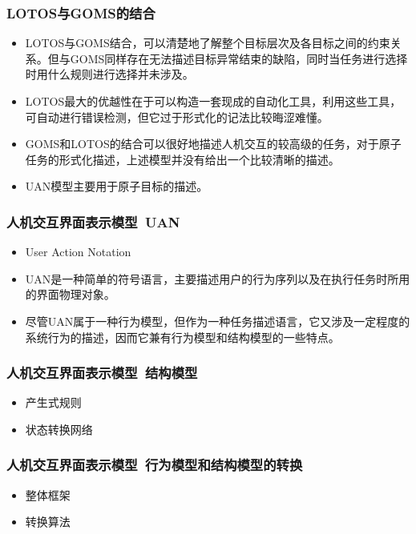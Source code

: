 \documentclass{beamer}
\begin{document}
\begin{frame}
	\frametitle{LOTOS与GOMS的结合}
	\beamertemplatetransparentcovereddynamicmedium
	\begin{itemize}[<+->]
		\item LOTOS与GOMS结合，可以清楚地了解整个目标层次及各目标之间的约束关系。但与GOMS同样存在无法描述目标异常结束的缺陷，同时当任务进行选择时用什么规则进行选择并未涉及。
		\item LOTOS最大的优越性在于可以构造一套现成的自动化工具，利用这些工具，可自动进行错误检测，但它过于形式化的记法比较晦涩难懂。
		\item GOMS和LOTOS的结合可以很好地描述人机交互的较高级的任务，对于原子任务的形式化描述，上述模型并没有给出一个比较清晰的描述。
		\item UAN模型主要用于原子目标的描述。
	\end{itemize}
\end{frame}

\begin{frame}
	\frametitle{人机交互界面表示模型~{\small UAN}}
	\beamertemplatetransparentcovereddynamicmedium
	\begin{itemize}[<+->]
		\item User Action Notation~\cite{hartson1990uan}
		\item UAN是一种简单的符号语言，主要描述用户的行为序列以及在执行任务时所用的界面物理对象。 
		\item 尽管UAN属于一种行为模型，但作为一种任务描述语言，它又涉及一定程度的系统行为的描述，因而它兼有行为模型和结构模型的一些特点。
	\end{itemize}
\end{frame}

\begin{frame}
	\frametitle{人机交互界面表示模型~{\small 结构模型}}
	\begin{itemize}
		\item 产生式规则
		\item 状态转换网络
	\end{itemize}
\end{frame}

\begin{frame}
	\frametitle{人机交互界面表示模型~{\small 行为模型和结构模型的转换}}
	\begin{itemize}
		\item 整体框架
		\item 转换算法
	\end{itemize}
\end{frame}
\end{document}
